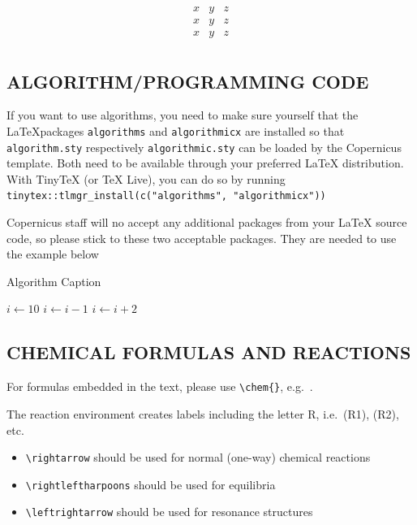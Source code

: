 \documentclass[gmd, manuscript]{copernicus}
\begin{document}
\[
\begin{matrix}
x & y & z\\
x & y & z\\
x & y & z\\
\end{matrix}
\]

\subsection{ALGORITHM/PROGRAMMING CODE}

If you want to use algorithms, you need to make sure yourself that the
\LaTeX packages \texttt{algorithms} and \texttt{algorithmicx} are
installed so that \texttt{algorithm.sty} respectively
\texttt{algorithmic.sty} can be loaded by the Copernicus template. Both
need to be available through your preferred \LaTeX{} distribution. With
TinyTeX (or TeX Live), you can do so by running
\texttt{tinytex::tlmgr\_install(c("algorithms",\ "algorithmicx"))}

Copernicus staff will no accept any additional packages from your LaTeX
source code, so please stick to these two acceptable packages. They are
needed to use the example below

\begin{algorithm}
\caption{Algorithm Caption}
\label{a1}
\begin{algorithmic}
\STATE $i\gets 10$
        \STATE $i\gets i-1$
\ELSE
                \STATE $i\gets i+2$
        \ENDIF
\ENDIF
\end{algorithmic}
\end{algorithm}

\subsection{CHEMICAL FORMULAS AND REACTIONS}

For formulas embedded in the text, please use
\texttt{\textbackslash{}chem\{\}}, e.g.~.

The reaction environment creates labels including the letter R,
i.e.~(R1), (R2), etc.

\begin{itemize}
\item
  \texttt{\textbackslash{}rightarrow} should be used for normal
  (one-way) chemical reactions
\item
  \texttt{\textbackslash{}rightleftharpoons} should be used for
  equilibria
\item
  \texttt{\textbackslash{}leftrightarrow} should be used for resonance
  structures
\end{itemize}
\end{document}
